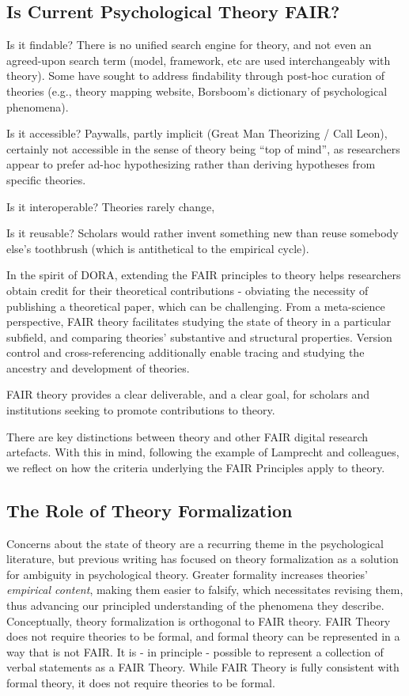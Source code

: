 \documentclass[
  man]{apa6}
\begin{document}
\subsection{Is Current Psychological Theory FAIR?}\label{is-current-psychological-theory-fair}

Is it findable? There is no unified search engine for theory, and not even an agreed-upon search term (model, framework, etc are used interchangeably with theory). Some have sought to address findability through post-hoc curation of theories (e.g., theory mapping website, Borsboom's dictionary of psychological phenomena).

Is it accessible? Paywalls, partly implicit (Great Man Theorizing / Call Leon), certainly not accessible in the sense of theory being ``top of mind'', as researchers appear to prefer ad-hoc hypothesizing rather than deriving hypotheses from specific theories.

Is it interoperable? Theories rarely change,

Is it reusable? Scholars would rather invent something new than reuse somebody else's toothbrush (which is antithetical to the empirical cycle).

In the spirit of DORA, extending the FAIR principles to theory helps researchers obtain credit for their theoretical contributions - obviating the necessity of publishing a theoretical paper, which can be challenging.
From a meta-science perspective, FAIR theory facilitates studying the state of theory in a particular subfield, and comparing theories' substantive and structural properties. Version control and cross-referencing additionally enable tracing and studying the ancestry and development of theories.

FAIR theory provides a clear deliverable, and a clear goal, for scholars and institutions seeking to promote contributions to theory.

There are key distinctions between theory and other FAIR digital research artefacts. With this in mind, following the example of Lamprecht and colleagues, we reflect on how the criteria underlying the FAIR Principles apply to theory.

\subsection{The Role of Theory Formalization}\label{the-role-of-theory-formalization}

Concerns about the state of theory are a recurring theme in the psychological literature,
but previous writing has focused on theory formalization as a solution for ambiguity in psychological theory.
Greater formality increases theories' \emph{empirical content},
making them easier to falsify,
which necessitates revising them,
thus advancing our principled understanding of the phenomena they describe.
Conceptually, theory formalization is orthogonal to FAIR theory.
FAIR Theory does not require theories to be formal, and formal theory can be represented in a way that is not FAIR.
It is - in principle - possible to represent a collection of verbal statements as a FAIR Theory.
While FAIR Theory is fully consistent with formal theory, it does not require theories to be formal.
\end{document}
